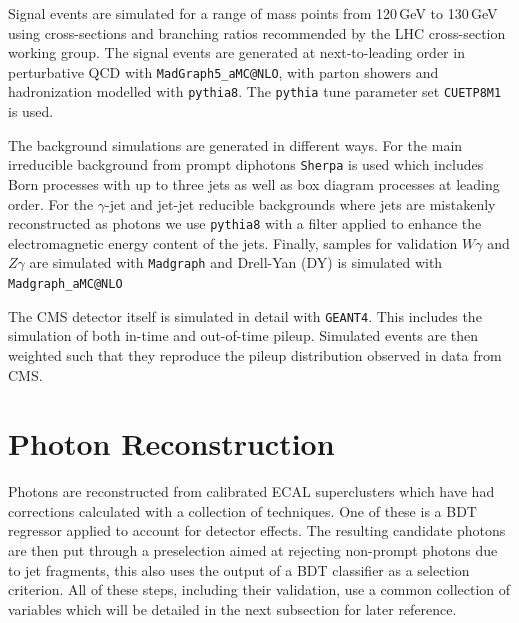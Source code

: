 Signal events are simulated for a range of mass points from 120\,GeV to 130\,GeV using cross-sections and branching ratios recommended by the LHC cross-section working group. 
The signal events are generated at next-to-leading order in perturbative QCD with \texttt{MadGraph5_{}aMC@NLO}, with  parton showers and hadronization modelled with \texttt{pythia8}. The \texttt{pythia} tune parameter set \texttt{CUETP8M1} is used.

The background simulations are generated in different ways. For the main irreducible background from prompt diphotons \texttt{Sherpa} is used which includes Born processes with up to three jets as well as box diagram processes at leading order. 
For the $\gamma$-jet and jet-jet reducible backgrounds where jets are mistakenly reconstructed as photons we use \texttt{pythia8} with a filter applied to enhance the electromagnetic energy content of the jets. 
Finally, samples for validation $W\gamma$ and $Z\gamma$ are simulated with \texttt{Madgraph} and Drell-Yan (DY) is simulated with \texttt{Madgraph_{}aMC@NLO}


The CMS detector itself is simulated in detail with \texttt{GEANT4}. 
This includes the simulation of both in-time and out-of-time pileup. 
Simulated events are then weighted such that they reproduce the pileup distribution observed in data from CMS.


\section{Photon Reconstruction}
Photons are reconstructed from calibrated ECAL superclusters which have had corrections calculated with a collection of techniques. One of these is a BDT regressor applied to account for detector effects. The resulting candidate photons are then put through a preselection aimed at rejecting non-prompt photons due to jet fragments, this also uses the output of a BDT classifier as a selection criterion.
All of these steps, including their validation, use a common collection of variables which will be detailed in the next subsection for later reference. 

